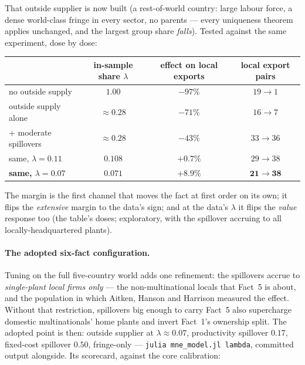 \documentclass[11pt]{article}
\theoremstyle{plain}
\theoremstyle{remark}
\theoremstyle{definition}
\begin{document}
That outside supplier is now built (a rest-of-world country: large labour force, a
dense world-class fringe in every sector, no parents --- every uniqueness theorem
applies unchanged, and the largest group share \emph{falls}). Tested against the same
experiment, dose by dose:

\begin{center}
\begin{tabular}{lccc}
\toprule
 & in-sample share $\lambda$ & effect on local exports & local export pairs\\
\midrule
no outside supply & $1.00$ & $-97\%$ & $19\to1$\\
outside supply alone & $\approx0.28$ & $-71\%$ & $16\to7$\\
+ moderate spillovers & $\approx0.28$ & $-43\%$ & $33\to36$\\
same, $\lambda=0.11$ & $0.108$ & $+0.7\%$ & $29\to38$\\
\textbf{same, $\lambda=0.07$} & $\mathbf{0.071}$ & $\mathbf{+8.9\%}$ & $\mathbf{21\to38}$\\
\bottomrule
\end{tabular}
\end{center}

\noindent The margin is the first channel that moves the fact at first order on its
own; it flips the \emph{extensive} margin to the data's sign; and at the data's
$\lambda$ it flips the \emph{value} response too (the table's doses; exploratory,
with the spillover accruing to all locally-headquartered plants).

\paragraph{The adopted six-fact configuration.} Tuning on the full five-country world
adds one refinement: the spillovers accrue to \emph{single-plant local firms only} ---
the non-multinational locals that Fact~5 is about, and the population in which Aitken,
Hanson and Harrison measured the effect. Without that restriction, spillovers big
enough to carry Fact~5 also supercharge domestic multinationals' home plants and
invert Fact~1's ownership split. The adopted point is then: outside supplier at
$\lambda\approx0.07$, productivity spillover $0.17$, fixed-cost spillover $0.50$,
fringe-only --- \texttt{julia mne\_model.jl lambda}, committed output alongside. Its
scorecard, against the core calibration:
\end{document}
